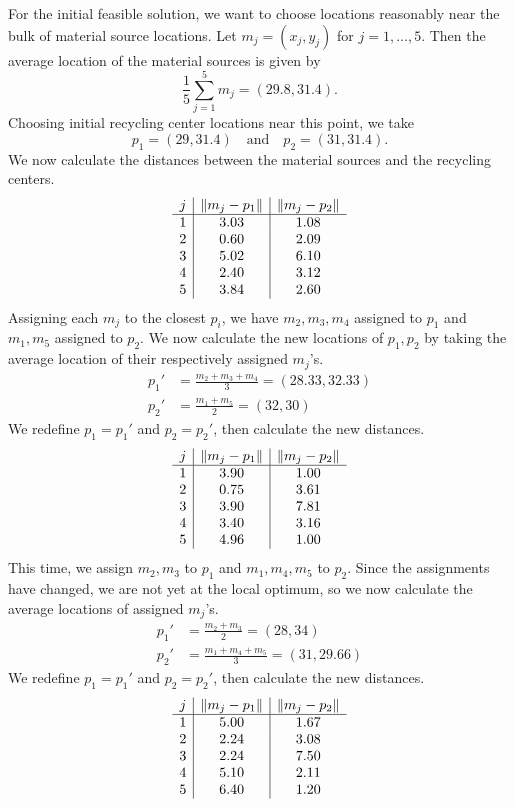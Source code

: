 \documentclass[12pt]{article}
\theoremstyle{definition}
\newcommand{\isp}[1]{\quad\text{#1}\quad}
\begin{document}
For the initial feasible solution, we want to choose locations reasonably near the bulk of material source locations. Let $m_j = (x_j, y_j)$ for $j = 1, \dots, 5$. Then the average location of the material sources is given by
\[
    \frac{1}{5}\sum_{j=1}^5 m_j = (29.8, 31.4).
\]
Choosing initial recycling center locations near this point, we take
\[
    p_1 = (29, 31.4) \isp{and} p_2 = (31, 31.4).
\]
We now calculate the distances between the material sources and the recycling centers.
\[\begin{array}{c|c|c}
    j & \norm{m_j - p_1} & \norm{m_j - p_2} \\
    \hline
    1 & 3.03 & 1.08 \\
    2 & 0.60 & 2.09 \\
    3 & 5.02 & 6.10 \\
    4 & 2.40 & 3.12 \\
    5 & 3.84 & 2.60 
\end{array}\]
Assigning each $m_j$ to the closest $p_i$, we have $m_2, m_3, m_4$ assigned to $p_1$ and $m_1, m_5$ assigned to $p_2$. We now calculate the new locations of $p_1, p_2$ by taking the average location of their respectively assigned $m_j$'s.
\begin{align*}
    p_1' &= \frac{m_2 + m_3 + m_4}{3} = (28.33, 32.33) \\
    p_2' &= \frac{m_1 + m_5}{2} = (32, 30)
\end{align*}
We redefine $p_1 = p_1'$ and $p_2 = p_2'$, then calculate the new distances.
\[\begin{array}{c|c|c}
    j & \norm{m_j - p_1} & \norm{m_j - p_2} \\
    \hline
    1 & 3.90 &	1.00 \\
    2 & 0.75 &	3.61 \\
    3 & 3.90 &	7.81 \\
    4 & 3.40 &	3.16 \\
    5 & 4.96 &	1.00 
\end{array}\]
This time, we assign $m_2, m_3$ to $p_1$ and $m_1, m_4, m_5$ to $p_2$. Since the assignments have changed, we are not yet at the local optimum, so we now calculate the average locations of assigned $m_j$'s.
\begin{align*}
    p_1' &= \frac{m_2 + m_3}{2} = (28, 34) \\
    p_2' &= \frac{m_1 + m_4 + m_5}{3} = (31, 29.66)
\end{align*}
We redefine $p_1 = p_1'$ and $p_2 = p_2'$, then calculate the new distances.
\[\begin{array}{c|c|c}
    j & \norm{m_j - p_1} & \norm{m_j - p_2} \\
    \hline
    1 & 5.00 &	1.67 \\
    2 & 2.24 &	3.08 \\
    3 & 2.24 &	7.50 \\
    4 & 5.10 &	2.11 \\
    5 & 6.40 &	1.20
\end{array}\]
\end{document}
